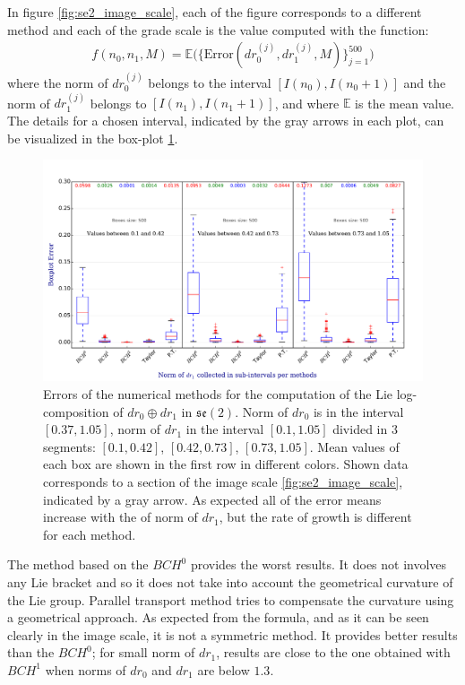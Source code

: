 In figure \ref{fig:se2_image_scale}, each of the figure corresponds to a different method and each of the grade scale is the value computed with the function:
\begin{align*}
f(n_0,n_1,M) 
=
 \mathbb{E}\Big(
  \{ 
  \text{Error}(dr_{0}^{(j)},dr_{1}^{(j)}, M) 
  \}_{j=1}^{500}
  \Big)
\end{align*}
where the norm of $dr_{0}^{(j)}$ belongs to the interval $[I(n_0), I(n_0+1)]$ and the norm of 
$dr_{1}^{(j)}$ belongs to $[I(n_1), I(n_1+1)]$, and where $\mathbb{E}$ is the mean value.\\
The details for a chosen interval, indicated by the gray arrows in each plot, can be visualized in the box-plot \ref{fig:se2_boxplot}.
%
\begin{figure}[!ht]
	\hspace{-1cm}
	\includegraphics[scale=0.51]{figures/se2_boxplot.pdf}
	\caption{Errors of the numerical methods for the computation of the Lie log-composition of $dr_{0} \oplus dr_{1}$ in $\mathfrak{se}(2)$. Norm of $dr_{0}$ is in the interval $[0.37,1.05]$, norm of $dr_{1}$ in the interval $[0.1, 1.05]$ divided in 3 segments: $[0.1,0.42] $, $[0.42, 0.73] $, $[0.73, 1.05] $. Mean values of each box are shown in the first row in different colors. Shown data corresponds to a section of the image scale \ref{fig:se2_image_scale}, indicated by a gray arrow. As expected all of the error means increase with the of norm of $dr_1$, but the rate of growth is different for each method.}
	\label{fig:se2_boxplot}
\end{figure}
%

The method based on the $BCH^0$ provides the worst results. It does not involves any Lie bracket and so it does not take into account the geometrical curvature of the Lie group. Parallel transport method tries to compensate the curvature using a geometrical approach. As expected from the formula, and as it can be seen clearly in the image scale, it is not a symmetric method. It provides better results than the $BCH^0$; for small norm of $dr_1$, results are close to the one obtained with $BCH^1$ when norms of $dr_0$ and $dr_1$ are below $1.3$.

